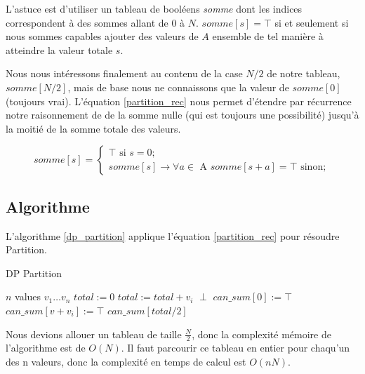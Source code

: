 L'astuce est d'utiliser un tableau de booléens \emph{somme} dont les indices correspondent à des sommes allant de $0$ à $N$. $somme[s] = \top$ si et seulement si nous sommes capables ajouter des valeurs de $A$ ensemble de tel manière à atteindre la valeur totale $s$. 

Nous nous intéressons finalement au contenu de la case $N/2$ de notre tableau, $somme[N/2]$, mais de base nous ne connaissons que la valeur de $somme[0]$ (toujours vrai). L'équation \ref{partition_rec} nous permet d'étendre par récurrence notre raisonnement de de la somme nulle (qui est toujours une possibilité) jusqu'à la moitié de la somme totale des valeurs.

\begin{equation}
\label{partition_rec}
somme[s] = 
\begin{cases}
\top \text{ si } s = 0; \\
somme[s] \rightarrow \forall a \in \text{ A } somme[s + a] = \top \text{ sinon} ;
\end{cases}
\end{equation}

\subsection{Algorithme}
L'algorithme \ref{dp_partition} applique l'équation \ref{partition_rec} pour résoudre Partition.


\begin{algorithm}[!ht]
\caption{DP Partition}
\label{dp_partition}
\begin{algorithmic}[1]
\REQUIRE $n$ values $v_1 \dots v_n$
\STATE $total := 0$
	\STATE $total := total + v_i$
\ENDFOR
{}
	\RETURN $\perp$
\ENDIF
\STATE $can\_sum[0] := \top$ 
			\STATE $can\_sum[v + v_i] := \top$
		\ENDIF
	\ENDFOR
\ENDFOR
\RETURN $can\_sum[total/2]$
\end{algorithmic}
\end{algorithm}

Nous devions allouer un tableau de taille $\frac{N}{2}$, donc la complexité mémoire de l'algorithme est de $O(N).$ Il faut parcourir ce tableau en entier pour chaqu'un des n valeurs, donc la complexité en temps de calcul est $O(nN)$. 


